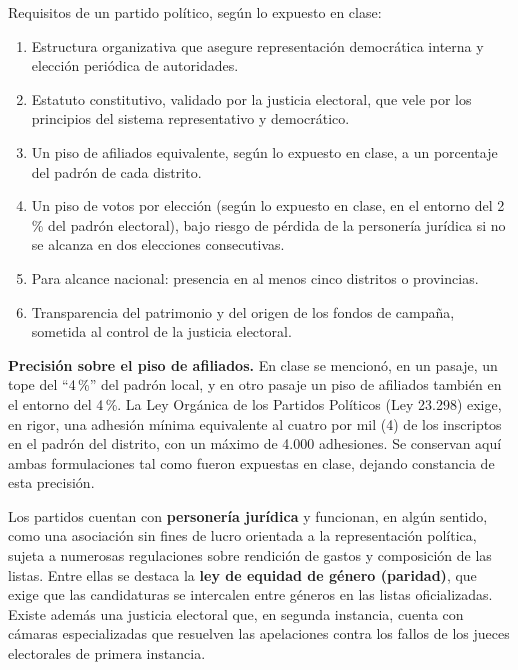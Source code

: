 \documentclass[12pt,oneside]{book}
\begin{document}
\begin{important}
Requisitos de un partido político, según lo expuesto en clase:
\begin{enumerate}[label=\alph*)]
\item Estructura organizativa que asegure representación democrática interna y elección periódica de autoridades.
\item Estatuto constitutivo, validado por la justicia electoral, que vele por los principios del sistema representativo y democrático.
\item Un piso de afiliados equivalente, según lo expuesto en clase, a un porcentaje del padrón de cada distrito.
\item Un piso de votos por elección (según lo expuesto en clase, en el entorno del 2\,\% del padrón electoral), bajo riesgo de pérdida de la personería jurídica si no se alcanza en dos elecciones consecutivas.
\item Para alcance nacional: presencia en al menos cinco distritos o provincias.
\item Transparencia del patrimonio y del origen de los fondos de campaña, sometida al control de la justicia electoral.
\end{enumerate}
\end{important}

\begin{note}
\textbf{Precisión sobre el piso de afiliados.} En clase se mencionó, en un pasaje, un tope del ``4\,\%'' del padrón local, y en otro pasaje un piso de afiliados también en el entorno del 4\,\%. La Ley Orgánica de los Partidos Políticos (Ley 23.298) exige, en rigor, una adhesión mínima equivalente al cuatro por mil (4\textperthousand) de los inscriptos en el padrón del distrito, con un máximo de 4.000 adhesiones. Se conservan aquí ambas formulaciones tal como fueron expuestas en clase, dejando constancia de esta precisión.
\end{note}

Los partidos cuentan con \textbf{personería jurídica} y funcionan, en algún sentido, como una asociación sin fines de lucro orientada a la representación política, sujeta a numerosas regulaciones sobre rendición de gastos y composición de las listas. Entre ellas se destaca la \textbf{ley de equidad de género (paridad)}, que exige que las candidaturas se intercalen entre géneros en las listas oficializadas. Existe además una justicia electoral que, en segunda instancia, cuenta con cámaras especializadas que resuelven las apelaciones contra los fallos de los jueces electorales de primera instancia.
\end{document}
